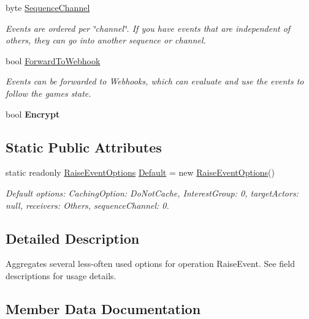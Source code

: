 \begin{DoxyCompactItemize}
byte \hyperlink{class_raise_event_options_a3fff0d28599564c9d69c147ea39682d6}{Sequence\+Channel}
\begin{DoxyCompactList}\small\item\em Events are ordered per \char`\"{}channel\char`\"{}. If you have events that are independent of others, they can go into another sequence or channel.\end{DoxyCompactList}\item 
bool \hyperlink{class_raise_event_options_a389e7e5b0df4ce93ba2731a51abc560b}{Forward\+To\+Webhook}
\begin{DoxyCompactList}\small\item\em Events can be forwarded to Webhooks, which can evaluate and use the events to follow the game\textquotesingle{}s state.\end{DoxyCompactList}\item 
bool {\bfseries Encrypt}\hypertarget{class_raise_event_options_aceba8258488a041c9b52df3bf485830c}{}\label{class_raise_event_options_aceba8258488a041c9b52df3bf485830c}

\end{DoxyCompactItemize}
\subsection*{Static Public Attributes}
\begin{DoxyCompactItemize}
\item 
static readonly \hyperlink{class_raise_event_options}{Raise\+Event\+Options} \hyperlink{class_raise_event_options_af1fcb68ddd5f76876c8448de8b5ecb4d}{Default} = new \hyperlink{class_raise_event_options}{Raise\+Event\+Options}()
\begin{DoxyCompactList}\small\item\em Default options\+: Caching\+Option\+: Do\+Not\+Cache, Interest\+Group\+: 0, target\+Actors\+: null, receivers\+: Others, sequence\+Channel\+: 0.\end{DoxyCompactList}\end{DoxyCompactItemize}


\subsection{Detailed Description}
Aggregates several less-\/often used options for operation Raise\+Event. See field descriptions for usage details.



\subsection{Member Data Documentation}
